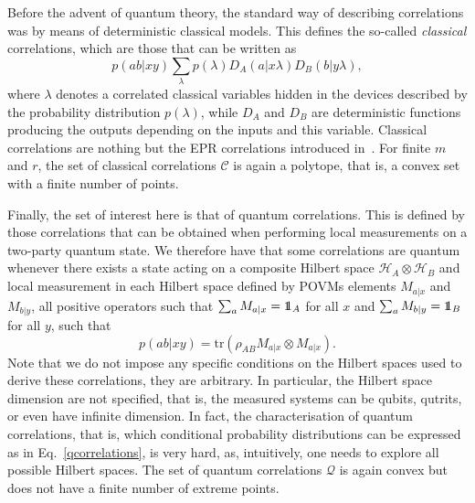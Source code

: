 \documentclass[a4paper]{article}
\def\tr{\mbox{tr}}
\def\one{\leavevmode\hbox{\small1\normalsize\kern-.33em1}}
\begin{document}
Before the advent of quantum theory, the standard way of describing correlations was by means of deterministic classical models. This defines the so-called \emph{classical} correlations, which are those that can be written as
\begin{equation}
p(ab|xy)\sum_\lambda p(\lambda)D_A(a|x\lambda)D_B(b|y\lambda) ,
\end{equation}
where $\lambda$ denotes a correlated classical variables hidden in the devices described by the probability distribution $p(\lambda)$, while $D_A$ and $D_B$ are deterministic functions producing the outputs depending on the inputs and this variable. Classical correlations are nothing but the EPR correlations introduced in~\cite{EPR}. For finite $m$ and $r$, the set of classical correlations $\mathcal C$ is again a polytope, that is, a convex set with a finite number of points.

Finally, the set of interest here is that of quantum correlations. This is defined by those correlations that can be obtained when performing local measurements on a two-party quantum state. We therefore have that some correlations are quantum whenever there exists a state acting on a composite Hilbert space $\mathcal H_A\otimes\mathcal H_B$ and local measurement in each Hilbert space defined by POVMs elements $M_{a|x}$ and $M_{b|y}$, all positive operators such that $\sum_a M_{a|x}=\one_A$ for all $x$ and $\sum_a M_{b|y}=\one_B$ for all $y$, such that
\begin{equation}
\label{qcorrelations}
p(ab|xy)=\tr(\rho_{AB}M_{a|x}\otimes M_{a|x}) .
\end{equation}
Note that we do not impose any specific conditions on the Hilbert spaces used to derive these correlations, they are arbitrary. In particular, the Hilbert space dimension are not specified, that is, the measured systems can be qubits, qutrits, or even have infinite dimension. In fact, the characterisation of quantum correlations, that is, which conditional probability distributions can be expressed as in Eq.~\eqref{qcorrelations}, is very hard, as, intuitively, one needs to explore all possible Hilbert spaces. The set of quantum correlations $\mathcal Q$ is again convex but does not have a finite number of extreme points. 
\end{document}
